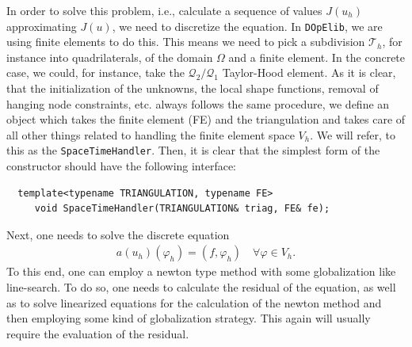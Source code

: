 \documentclass[smallextended]{svjour3}       %
\numberwithin{equation}{section}
\renewcommand{\phi}{\varphi}
\newcommand{\dope}{\texttt{DOpElib}}
\begin{document}
In order to solve this problem, i.e., calculate a sequence of values $J(u_h)$ approximating $J(u)$,
we need to discretize 
the equation. In \dope, we are using finite elements to do this. This means we need to pick a 
subdivision $\mathcal T_h$, for instance into quadrilaterals,
of the domain $\Omega$ and a finite element. In the concrete case, we could, 
for instance, take the $\mathcal Q_2/\mathcal Q_1$ Taylor-Hood element.
As it is clear, that the initialization of the unknowns, the local shape 
functions, removal of hanging node constraints, etc. always follows the 
same procedure, we define an object which takes the finite element (FE)
and the triangulation and takes care of all other things related to
handling the finite element space $V_h$. We will refer, to 
this as the \texttt{SpaceTimeHandler}. Then, it is clear that the simplest 
form of the constructor should have the following interface:
\begin{lstlisting}
  template<typename TRIANGULATION, typename FE>
     void SpaceTimeHandler(TRIANGULATION& triag, FE& fe);
\end{lstlisting}
Next, one needs to solve the discrete equation
\begin{align}\label{eq:discrete_equation}
a(u_h)(\phi_h) = (f,\phi_h) \quad \forall \phi \in V_h.
\end{align}
To this end, one can employ a newton type method with some globalization 
like line-search. To do so, one needs to calculate the residual of the 
equation, as well as to solve linearized equations for the calculation of 
the newton method and then employing some kind of globalization strategy.
This again will usually require the evaluation of the residual.
\end{document}
